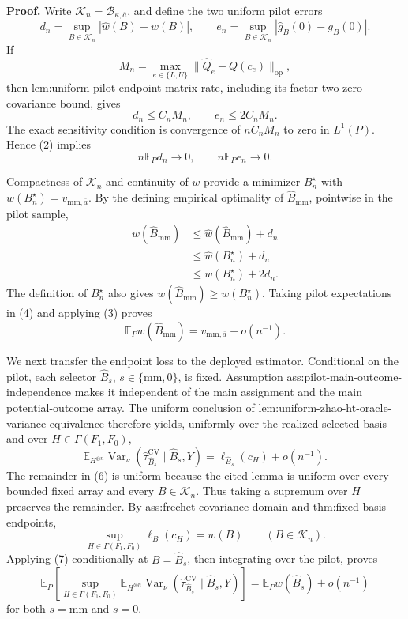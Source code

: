 \textbf{Proof.}
Write \(\mathcal K_n=\mathcal B_{\kappa,\overline a}\), and define the two uniform pilot errors
\[
d_n=\sup_{B\in\mathcal K_n}|\widehat w(B)-w(B)|,
\qquad
e_n=\sup_{B\in\mathcal K_n}|\widehat g_B(0)-g_B(0)|.
\tag{1}
\]
If
\[
M_n=\max_{e\in\{L,U\}}\|\widehat Q_e-Q(c_e)\|_{\mathrm{op}},
\]
then lem:uniform-pilot-endpoint-matrix-rate, including its factor-two zero-covariance bound, gives
\[
d_n\le C_nM_n,
\qquad
e_n\le 2C_nM_n.
\tag{2}
\]
The exact sensitivity condition is convergence of \(nC_nM_n\) to zero in \(L^1(P)\).  Hence (2) implies
\[
n\mathbb E_Pd_n\longrightarrow0,
\qquad
n\mathbb E_Pe_n\longrightarrow0.
\tag{3}
\]

Compactness of \(\mathcal K_n\) and continuity of \(w\) provide a minimizer \(B_n^\star\) with \(w(B_n^\star)=v_{\mathrm{mm},\overline a}\).  By the defining empirical optimality of \(\widehat B_{\mathrm{mm}}\), pointwise in the pilot sample,
\[
\begin{aligned}
w(\widehat B_{\mathrm{mm}})
&\le \widehat w(\widehat B_{\mathrm{mm}})+d_n\\
&\le \widehat w(B_n^\star)+d_n\\
&\le w(B_n^\star)+2d_n.
\end{aligned}
\tag{4}
\]
The definition of \(B_n^\star\) also gives \(w(\widehat B_{\mathrm{mm}})\ge w(B_n^\star)\).  Taking pilot expectations in (4) and applying (3) proves
\[
\mathbb E_Pw(\widehat B_{\mathrm{mm}})
=v_{\mathrm{mm},\overline a}+o(n^{-1}).
\tag{5}
\]

We next transfer the endpoint loss to the deployed estimator.  Conditional on the pilot, each selector \(\widehat B_s\), \(s\in\{\mathrm{mm},0\}\), is fixed.  Assumption ass:pilot-main-outcome-independence makes it independent of the main assignment and the main potential-outcome array.  The uniform conclusion of lem:uniform-zhao-ht-oracle-variance-equivalence therefore yields, uniformly over the realized selected basis and over \(H\in\Gamma(F_1,F_0)\),
\[
\mathbb E_{H^{\otimes n}}
\operatorname{Var}_\nu
\!\left(\widehat\tau_{\widehat B_s}^{\mathrm{CV}}
\mid\widehat B_s,Y\right)
=\ell_{\widehat B_s}(c_H)+o(n^{-1}).
\tag{6}
\]
The remainder in (6) is uniform because the cited lemma is uniform over every bounded fixed array and every \(B\in\mathcal K_n\).  Thus taking a supremum over \(H\) preserves the remainder.  By ass:frechet-covariance-domain and thm:fixed-basis-endpoints,
\[
\sup_{H\in\Gamma(F_1,F_0)}\ell_B(c_H)=w(B)
\qquad(B\in\mathcal K_n).
\tag{7}
\]
Applying (7) conditionally at \(B=\widehat B_s\), then integrating over the pilot, proves
\[
\mathbb E_P\!\left[
\sup_{H\in\Gamma(F_1,F_0)}
\mathbb E_{H^{\otimes n}}
\operatorname{Var}_\nu
\!\left(\widehat\tau_{\widehat B_s}^{\mathrm{CV}}
\mid\widehat B_s,Y\right)
\right]
=\mathbb E_Pw(\widehat B_s)+o(n^{-1})
\tag{8}
\]
for both \(s=\mathrm{mm}\) and \(s=0\).

